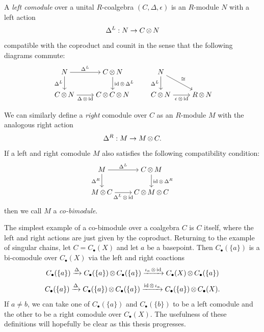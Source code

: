 \begin{defn}
A \emph{left comodule} over a unital $R$-coalgebra $(C, \Delta, \epsilon)$ is an $R$-module $N$ with a left action 
\[\Delta^L: N\to C\operatorname{\otimes} N\]
compatible with the coproduct and counit in the sense that the following diagrams commute:
\[\begin{tikzcd}[cramped]
	N & {C\tensor N} & N & \\
	{C\tensor N} & {C\tensor C\tensor N} & {C\tensor N} & {R\tensor N}
	\arrow["{\Delta^L}", from=1-1, to=1-2]
	\arrow["{\Delta^L}"', from=1-1, to=2-1]
	\arrow["{\id\tensor \Delta^L}", from=1-2, to=2-2]
	\arrow["{\Delta^L}"', from=1-3, to=2-3]
	\arrow["\cong", from=1-3, to=2-4]
	\arrow["{\Delta\tensor \id}"', from=2-1, to=2-2]
	\arrow["{\epsilon\tensor \id}"', from=2-3, to=2-4]
\end{tikzcd}\]
\end{defn}
We can similarly define a \emph{right} comodule over $C$ as an $R$-module $M$ with the analogous right action 
\[\Delta^R: M\to M\operatorname{\otimes} C.\]
If a left and right comodule $M$ also satisfies the following compatibility condition:
\[\begin{tikzcd}[cramped]
	M & {C\tensor M} \\
	{M\tensor C} & {C\tensor M \tensor C}
	\arrow["{\Delta^L}", from=1-1, to=1-2]
	\arrow["{\Delta^R}"', from=1-1, to=2-1]
	\arrow["{\id \tensor \Delta^R}", from=1-2, to=2-2]
	\arrow["{\Delta^L\tensor \id}"', from=2-1, to=2-2]
\end{tikzcd}\]
then we call $M$ a \emph{co-bimodule}. 

The simplest example of a co-bimodule over a coalgebra $C$ is $C$ itself, where the left and right actions are just given by the coproduct. Returning to the example of singular chains, let $C = C_\bullet(X)$ and let $a$ be a basepoint. Then $C_\bullet(\{a\})$ is a bi-comodule over $C_\bullet(X)$ via the left and right coactions
\[C_\bullet(\{a\})\xrightarrow{\Delta} C_\bullet(\{a\})\operatorname{\otimes} C_\bullet(\{a\}) \xrightarrow{\iota_a \operatorname{\otimes} \operatorname{id} } C_\bullet(X)\operatorname{\otimes} C_\bullet(\{a\})\]
\[C_\bullet(\{a\})\xrightarrow{\Delta} C_\bullet(\{a\})\operatorname{\otimes} C_\bullet(\{a\}) \xrightarrow{\operatorname{id} \operatorname{\otimes} \iota_a}  C_\bullet(\{a\}) \operatorname{\otimes} C_\bullet(X).\]
If $a\neq b$, we can take one of $C_\bullet(\{a\})$ and $C_\bullet(\{b\})$ to be a left comodule and the other to be a right comodule over $C_\bullet(X)$. The usefulness of these definitions will hopefully be clear as this thesis progresses.
